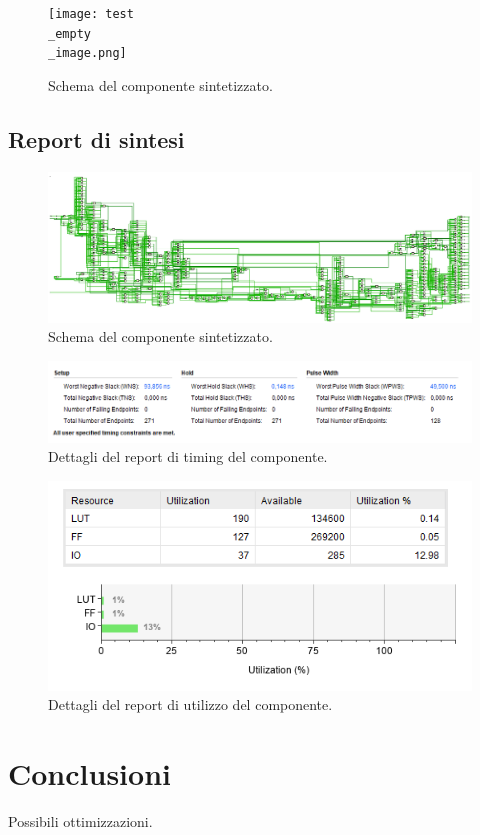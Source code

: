 \documentclass{article}
\begin{document}
\begin{figure}[h]
    \texttt{[image: test\\\_empty\\\_image.png]}
    \centering
    \caption{Schema del componente sintetizzato.}
\end{figure}

\subsection{Report di sintesi}

\begin{figure}[h]
    \includegraphics[width=\textwidth]{schema.png}
    \centering
    \caption{Schema del componente sintetizzato.}
\end{figure}

\begin{figure}[h]
    \includegraphics[width=\textwidth]{timing.png}
    \centering
    \caption{Dettagli del report di timing del componente.}
\end{figure}

\begin{figure}[h]
    \includegraphics[scale=0.5]{utilization.png}
    \centering
    \caption{Dettagli del report di utilizzo del componente.}
\end{figure}

\pagebreak
\section{Conclusioni}
Possibili ottimizzazioni.

\pagebreak
\printbibliography
\end{document}
